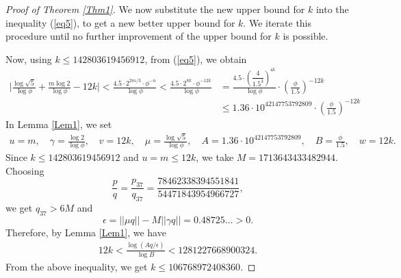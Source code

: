 \documentclass[12pt,reqno]{amsart}
\begin{document}
\begin{proof}[Proof of Theorem \ref{Thm1}]
We now substitute the new upper bound for $k$ into the inequality (\ref{eq5}), to get a new better upper bound for $k$. We iterate this procedure until no further improvement of the upper bound for $k$ is possible.

Now, using $k\leq 142803619456912$, from (\ref{eq5}), we obtain
\begin{align*}
\bigg|\frac{\log\sqrt{5}}{\log\phi}+\frac{m\log2}{\log\phi}-12k\bigg|<\frac{4.5\cdot 2^{2m/3}\cdot\phi^{-n}}{\log\phi}<\frac{4.5\cdot 2^{8k}\cdot\phi^{-{12k}}}{\log\phi}&=\frac{4.5\cdot (\dfrac{4}{1.5^3})^{4k}}{\log\phi}\cdot (\frac{\phi}{1.5})^{-12k}\\
&\leq 1.36\cdot 10^{42147753792809}\cdot (\frac{\phi}{1.5})^{-12k} 
\end{align*}
In Lemma \ref{Lem1}, we set
\begin{align*}
    u=m,\quad \gamma=\frac{\log2}{\log \phi},\quad v=12k,\quad \mu=\frac{\log\sqrt{5}}{\log \phi},\quad A=1.36\cdot 10^{42147753792809},\quad B=\frac{\phi}{1.5},\quad w=12k.
\end{align*}
Since $k\leq 142803619456912$ and $u=m\leq 12k$, we take $M=1713643433482944$. Choosing  
$$\frac{p}{q}=\frac{p_{37}}{q_{37}}=\frac{78462338394551841}{54471843954966727},$$
we get $q_{37}>6M$ and
$$\epsilon=||\mu q||-M||\gamma q||=0.48725\ldots>0.$$
Therefore, by Lemma \ref{Lem1}, we have
\begin{align*}
    12k<\frac{\log(Aq/\epsilon)}{\log B}<1281227668900324.
\end{align*}
From the above inequality, we get $k\leq 106768972408360$. 


\end{proof}
\end{document}

